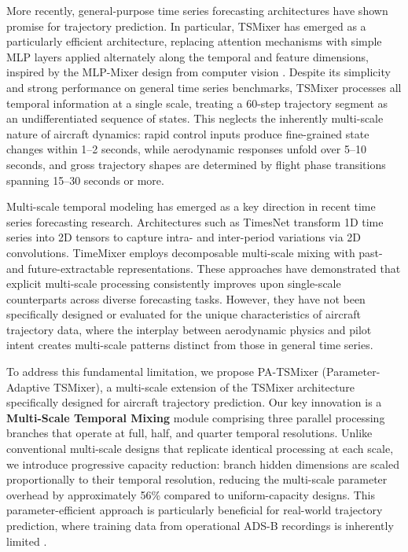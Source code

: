 \documentclass[letterpaper,journal]{IEEEtran}
\begin{document}
More recently, general-purpose time series forecasting architectures have shown promise
for trajectory prediction. In particular, TSMixer \cite{Chen2023TSMixer} has emerged as
a particularly efficient architecture, replacing attention mechanisms with simple MLP
layers applied alternately along the temporal and feature dimensions, inspired by the
MLP-Mixer design from computer vision \cite{Tolstikhin2021Mixer}. Despite its simplicity
and strong performance on general time series benchmarks, TSMixer processes all temporal
information at a single scale, treating a 60-step trajectory segment as an undifferentiated
sequence of states. This neglects the inherently multi-scale nature of aircraft dynamics:
rapid control inputs produce fine-grained state changes within 1--2 seconds, while aerodynamic
responses unfold over 5--10 seconds, and gross trajectory shapes are determined by flight
phase transitions spanning 15--30 seconds or more.

Multi-scale temporal modeling has emerged as a key direction in recent time series
forecasting research. Architectures such as TimesNet \cite{Wu2023TimesNet} transform
1D time series into 2D tensors to capture intra- and inter-period variations via 2D
convolutions. TimeMixer \cite{Wang2024TimeMixer} employs decomposable multi-scale mixing
with past- and future-extractable representations. These approaches have demonstrated
that explicit multi-scale processing consistently improves upon single-scale counterparts
across diverse forecasting tasks. However, they have not been specifically designed or
evaluated for the unique characteristics of aircraft trajectory data, where the interplay
between aerodynamic physics and pilot intent creates multi-scale patterns distinct from
those in general time series.

To address this fundamental limitation, we propose PA-TSMixer (Parameter-Adaptive
TSMixer), a multi-scale extension of the TSMixer architecture specifically designed
for aircraft trajectory prediction. Our key innovation is a \textbf{Multi-Scale
Temporal Mixing} module comprising three parallel processing branches that operate
at full, half, and quarter temporal resolutions. Unlike conventional multi-scale
designs that replicate identical processing at each scale, we introduce progressive
capacity reduction: branch hidden dimensions are scaled proportionally to their
temporal resolution, reducing the multi-scale parameter overhead by approximately
56\% compared to uniform-capacity designs. This parameter-efficient approach is
particularly beneficial for real-world trajectory prediction, where training data
from operational ADS-B recordings is inherently limited \cite{Sun2020}.
\end{document}
